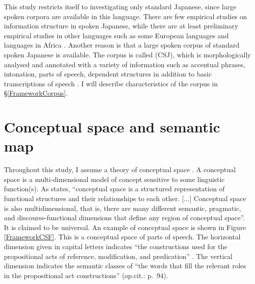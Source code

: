 This study restricts itself to investigating only standard Japanese,
since large spoken corpora are available in this language.
There are few empirical studies on information structure in spoken Japanese,
while there are at least preliminary empirical studies in other languages such as some European languages and languages in Africa \cite[e.g.,][]{cowles03,dipperetal04,dipperetal07,ritzetal08,skopeteasetal06,cookfildhauer11,chiarcosetal11}.
Another reason is that
a large spoken corpus of standard spoken Japanese is available.
The corpus is called  (CSJ),
which is morphologically analysed and annotated with a variety of information such as accentual phrases, intonation, parts of speech, dependent structures in addition to basic transcriptions of speech \cite{maekawa03,maekawaetal04}.
I will describe characteristics of the corpus in \S \ref{FrameworkCorpus}.


\section{Conceptual space and semantic map}\label{FrameworkSemanticMap}

Throughout this study,
I assume a theory of conceptual space \cite{croft01,haspelmath03}.
A conceptual space is a multi-dimensional model of concept sensitive to some linguistic function(s).
As  states,
``conceptual space is a structured representation of functional structures and their relationships to each other. [...] Conceptual space is also multidimensional, that is, there are many different semantic, pragmatic, and discourse-functional dimensions that define any region of conceptual space''.
It is claimed to be universal.
An example of conceptual space is shown in Figure \ref{FrameworkCSF}.
This is a conceptual space of parts of speech.
The horizontal dimension given in capital letters indicates
``the constructions used for the propositional acts of reference, modification, and predication'' \cite[][p.\ 93]{croft01}.
The vertical dimension indicates the semantic classes of ``the words that fill the relevant roles in the propositional act constructions''  (op.cit.: p.~94).

